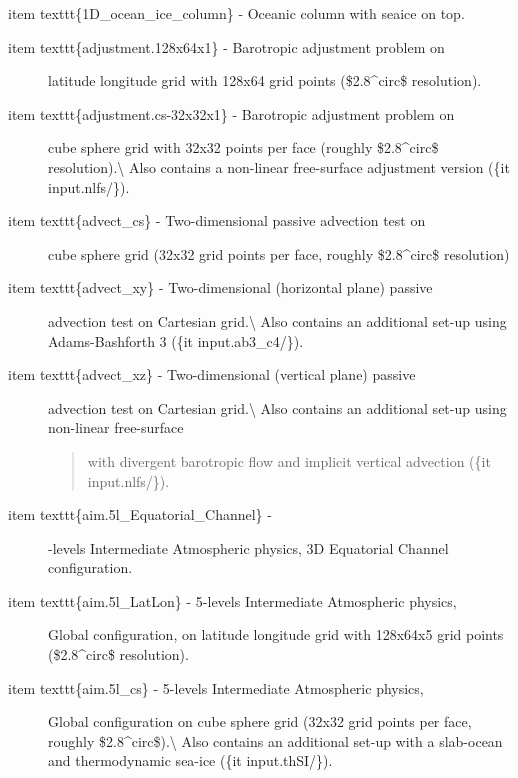 \documentclass[letterpaper,10pt,english]{sphinxmanual}
\begin{document}
item texttt\{1D\_ocean\_ice\_column\} - Oceanic column with seaice on top.
\begin{description}
\item[{item texttt\{adjustment.128x64x1\} - Barotropic adjustment problem on}] \leavevmode
latitude longitude grid with 128x64 grid points (\$2.8\textasciicircum{}circ\$ resolution).

\item[{item texttt\{adjustment.cs-32x32x1\} - Barotropic adjustment problem on}] \leavevmode
cube sphere grid with 32x32 points per face (roughly \$2.8\textasciicircum{}circ\$
resolution).\textbackslash{}
Also contains a non-linear free-surface adjustment version (\{it input.nlfs/\}).

\item[{item texttt\{advect\_cs\} - Two-dimensional passive advection test on}] \leavevmode
cube sphere grid (32x32 grid points per face, roughly \$2.8\textasciicircum{}circ\$ resolution)

\item[{item texttt\{advect\_xy\} - Two-dimensional (horizontal plane) passive}] \leavevmode
advection test on Cartesian grid.\textbackslash{}
Also contains an additional set-up using Adams-Bashforth 3 (\{it input.ab3\_c4/\}).

\item[{item texttt\{advect\_xz\} - Two-dimensional (vertical plane) passive}] \leavevmode
advection test on Cartesian grid.\textbackslash{}
Also contains an additional set-up using non-linear free-surface
\begin{quote}

with divergent barotropic flow and implicit vertical advection (\{it input.nlfs/\}).
\end{quote}

\item[{item texttt\{aim.5l\_Equatorial\_Channel\} -}] -levels Intermediate Atmospheric physics,
3D Equatorial Channel configuration.

\item[{item texttt\{aim.5l\_LatLon\} - 5-levels Intermediate Atmospheric physics,}] \leavevmode
Global configuration, on latitude longitude grid with 128x64x5 grid
points (\$2.8\textasciicircum{}circ\$ resolution).

\item[{item texttt\{aim.5l\_cs\} - 5-levels Intermediate Atmospheric physics,}] \leavevmode
Global configuration on cube sphere grid
(32x32 grid points per face, roughly \$2.8\textasciicircum{}circ\$).\textbackslash{}
Also contains an additional set-up with a slab-ocean and thermodynamic
sea-ice (\{it input.thSI/\}).


\end{description}
\end{document}
